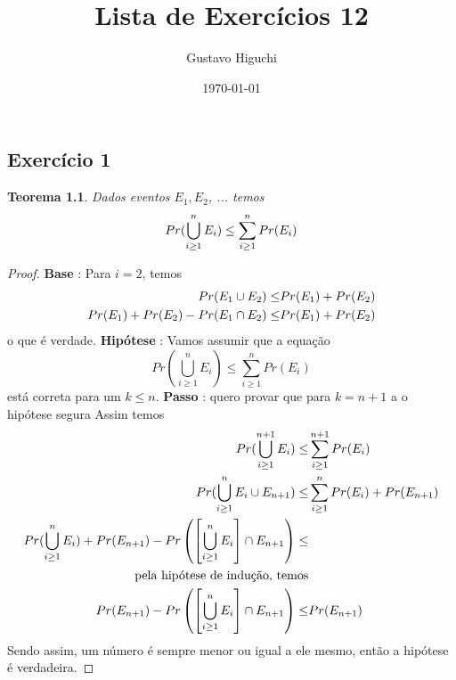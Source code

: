 \documentclass{article}
\title{Lista de Exercícios 12}
\author{Gustavo Higuchi}
\date{\today}
\begin{document}
\maketitle

\tableofcontents
\newpage


\chapter{}
\section{Exercício 1}
\newtheorem{teo1}{Teorema}
\begin{teo1}
    Dados eventos $E_1, E_2$, ... temos
    \begin{equation}
    \notag
        Pr(\bigcup\limits_{i \geq 1}^{n} E_i ) \leq \sum\limits_{i \geq 1}^{n}Pr(E_i)
    \end{equation}
\end{teo1}
\begin{proof}
    \hfill \break
    \textbf{Base} : Para $i = 2$, temos
    \begin{equation}
    \notag
        \begin{split}
            Pr(E_1 \cup E_2) \leq& Pr(E_1) + Pr(E_2)\\
            Pr(E_1) + Pr(E_2) - Pr(E_1 \cap E_2) \leq& Pr(E_1) + Pr(E_2)
        \end{split}
    \end{equation}
    \hspace*{30pt} o que é verdade.
    \textbf{Hipótese} : Vamos assumir que a equação
    \begin{equation}
        Pr(\bigcup\limits_{i \geq 1}^{n} E_i ) \leq \sum\limits_{i \geq 1}^{n}Pr(E_i)
    \end{equation}
    \hspace*{30pt} está correta para um $k \leq n$.
    \textbf{Passo} : quero provar que para $k = n + 1$ a o hipótese segura
    \hspace*{30pt} Assim temos \newline
    \begin{equation}
    \notag
        \begin{split}
            Pr(\bigcup\limits_{i \geq 1}^{n+1} E_i ) \leq& \sum\limits_{i \geq 1}^{n+1}Pr(E_i)\\
            Pr(\bigcup\limits_{i \geq 1}^{n} E_i \cup E_{n+1}) \leq & \sum\limits_{i \geq 1}^{n}Pr(E_i) + Pr(E_{n+1})\\
            Pr(\bigcup\limits_{i \geq 1}^{n} E_i) + Pr(E_{n+1}) - Pr\left(\left[\bigcup\limits_{i \geq 1}^{n} E_i\right]\cap E_{n+1}\right)  \leq &\\
            \text{pela hipótese de indução, temos}&\\
            Pr(E_{n+1}) - Pr\left(\left[\bigcup\limits_{i \geq 1}^{n} E_i\right]\cap E_{n+1}\right) \leq & Pr(E_{n+1})
        \end{split}
    \end{equation}
    Sendo assim, um número é sempre menor ou igual a ele mesmo, então a hipótese é verdadeira.
\end{proof}
\end{document}

